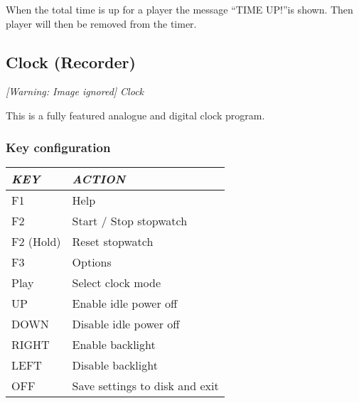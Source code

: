 When the total time is up for a player the message ``TIME UP!''is shown. Then player will  then be removed from the timer. 

\subsection{Clock (Recorder)}
{\centering\itshape
  [Warning: Image ignored] %
 \newline
Clock
\par}

This is a fully featured analogue and digital clock program.  

\subsubsection{Key configuration}

\begin{center}\begin{tabular}{|p{2.411cm}|p{6.012cm}|}
\hline
{\centering\bfseries\itshape
KEY
\par}
&
{\centering\bfseries\itshape
ACTION
\par}
\\\hline
{\centering
F1
\par}
&
Help
\\\hline
{\centering
F2
\par}
&
Start / Stop stopwatch
\\\hline
{\centering
F2 (Hold)
\par}
&
Reset stopwatch
\\\hline
{\centering
F3
\par}
&
Options
\\\hline
{\centering
Play
\par}
&
Select clock mode
\\\hline
{\centering
UP
\par}
&
Enable idle power off
\\\hline
{\centering
DOWN
\par}
&
Disable idle power off
\\\hline
{\centering
RIGHT
\par}
&
Enable backlight
\\\hline
{\centering
LEFT
\par}
&
Disable backlight
\\\hline
{\centering
OFF
\par}
&
Save settings to disk and exit
\\\hline
\end{tabular}\end{center}


